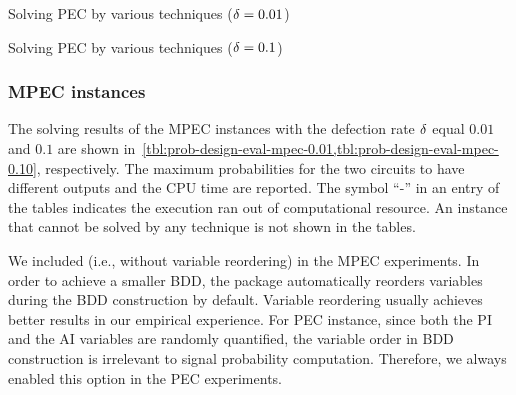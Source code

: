 \begin{table}[hp]
    \centering
    \scriptsize
    \caption{Solving PEC by various techniques ($\delta=0.01$)}
    \label{tbl:prob-design-eval-pec-0.01}
\end{table}

\begin{table}[ht]
    \centering
    \scriptsize
    \caption{Solving PEC by various techniques ($\delta=0.1$)}
    \label{tbl:prob-design-eval-pec-0.10}
\end{table}

\subsubsection{MPEC instances}
The solving results of the MPEC instances with the defection rate $\delta$ equal $0.01$ and $0.1$
are shown in~\cref{tbl:prob-design-eval-mpec-0.01,tbl:prob-design-eval-mpec-0.10}, respectively.
The maximum probabilities for the two circuits to have different outputs and the CPU time are reported.
The symbol ``-'' in an entry of the tables indicates the execution ran out of computational resource.
An instance that cannot be solved by any technique is not shown in the tables.

We included \bddspnr (i.e., \bddsp without variable reordering) in the MPEC experiments.
In order to achieve a smaller BDD,
the \cudd package automatically reorders variables during the BDD construction by default.
Variable reordering usually achieves better results in our empirical experience.
For PEC instance, since both the PI and the AI variables are randomly quantified,
the variable order in BDD construction is irrelevant to signal probability computation.
Therefore, we always enabled this option in the PEC experiments.

